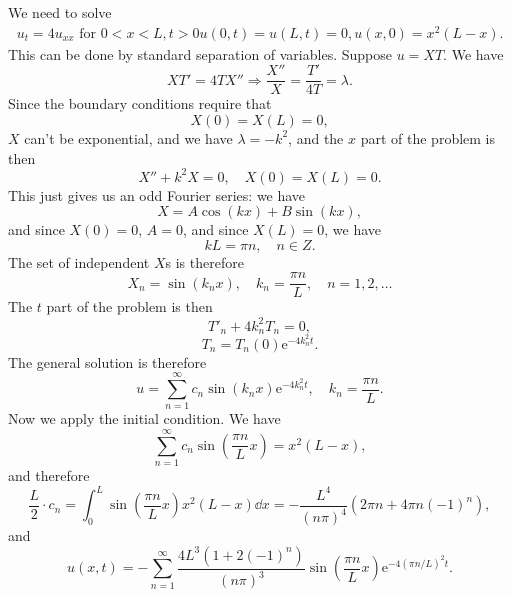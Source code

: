 \documentclass[hyperref, a4paper]{article}
\newcommand*{\ee}{\mathrm{e}}
\def\\{}%
\def\mathbb#1{#1}%
\begin{document}
We need to solve 
\begin{equation}
    \begin{gathered}
        u_t=4 u_{x x} \text { for } 0<x<L, t>0 \\
        u(0, t)=u(L, t)=0, \\
        u(x, 0)=x^2(L-x).
    \end{gathered}
\end{equation}
This can be done by standard separation of variables.
Suppose $u = X T$.
We have 
\[
    X T' = 4 T X'' \Rightarrow \frac{X''}{X} = \frac{T'}{4T} = \lambda.
\]
Since the boundary conditions require that 
\[
    X(0) = X(L) = 0,
\]
$X$ can't be exponential, and we have $\lambda = - k^2$,
and the $x$ part of the problem is then 
\[
    X'' + k^2 X = 0, \quad X(0) = X(L) = 0.
\]
This just gives us an odd Fourier series: 
we have 
\[
    X = A \cos (kx) + B \sin (kx),
\]
and since $X(0) = 0$, $A = 0$, 
and since $X(L) = 0$, we have 
\[
    k L = \pi n, \quad n \in \mathbb{Z}.
\]
The set of independent $X$s is therefore 
\begin{equation}
    X_n = \sin(k_n x), \quad k_n = \frac{\pi n }{L}, \quad n = 1, 2, \ldots
\end{equation}
The $t$ part of the problem is then 
\[
    T'_n + 4 k_n^2 T_n = 0,
\]
\begin{equation}
    T_n = T_n(0) \ee^{- 4 k_n^2 t}.
\end{equation}
The general solution is therefore 
\begin{equation}
    u = \sum_{n =1}^\infty c_n \sin(k_n x) \ee^{- 4 k_n^2 t}, \quad k_n = \frac{\pi n}{L}.
\end{equation}
Now we apply the initial condition.
We have 
\[
    \sum_{n =1}^\infty c_n \sin(\frac{\pi n}{L} x) = x^2(L-x),
\]
and therefore 
\begin{equation}
    \frac{L}{2} \cdot c_n = \int_{0}^{L} \sin(\frac{\pi n}{L} x) x^2(L-x) \dd{x}
    = - \frac{L^4}{(n \pi)^4} (2 \pi n + 4 \pi n (-1)^n),
\end{equation}
and 
\begin{equation}
    u(x, t) = - \sum_{n=1}^{\infty} \frac{4 L^3 (1 + 2 (-1)^n)}{(n \pi)^3} \sin(\frac{\pi n}{L} x) \ee^{- 4 (\pi n / L)^2 t}.
\end{equation}

\section{}
\end{document}

